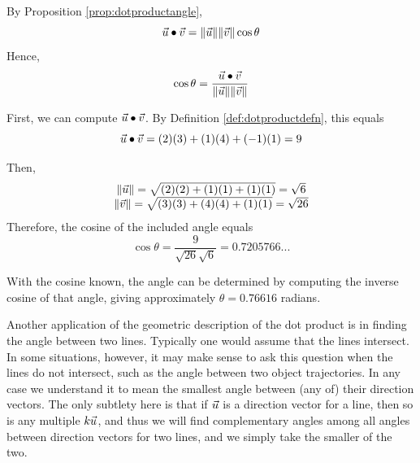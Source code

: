 \begin{solution}
By Proposition \ref{prop:dotproductangle},
\begin{equation*}
\vec{u}\bullet \vec{v}=\| \vec{u}\| \| \vec{v}
\| \cos \theta 
\end{equation*}
Hence, 
\begin{equation*}
\cos \theta =\frac{\vec{u}\bullet \vec{v}}{\| \vec{u}\| \| \vec{v}
\|}
\end{equation*}
 
First, we can compute $\vec{u}\bullet \vec{v}$. By Definition \ref{def:dotproductdefn}, this equals
\begin{equation*}
\vec{u}\bullet \vec{v}
=
(2)(3) + (1)(4)+(-1)(1) = 9
\end{equation*}

Then, 
\begin{equation*}
\begin{array}{c}
\| \vec{u} \|
=
\sqrt{(2)(2)+(1)(1)+(1)(1)}=\sqrt{6}\\
\|  \vec{v} \|
=
\sqrt{(3)(3)+(4)(4)+(1)(1)}=\sqrt{26}
\end{array}
\end{equation*}
 Therefore, the cosine of the included angle equals
\begin{equation*}
\cos \theta =\frac{9}{\sqrt{26}\sqrt{6}}=0.7205766...
\end{equation*}

With the cosine known, the angle can be determined by computing the
inverse cosine of that angle, giving approximately  $\theta =0.76616$ radians. 
\end{solution}

Another application of the geometric description of the dot product is
in finding the angle between two lines. Typically one would assume that the
lines intersect. In some situations, however, it may make sense to ask this
question when the lines do not intersect, such as the angle between
two object trajectories. In any case we understand it to mean the
smallest angle between (any of) their direction vectors. The only
subtlety here is that if $\vec{u}$ is a direction vector for a line,
then so is any multiple $k\vec{u}$, and thus we will find complementary angles
among all angles between direction vectors for two lines, and we
simply take the smaller of the two.

